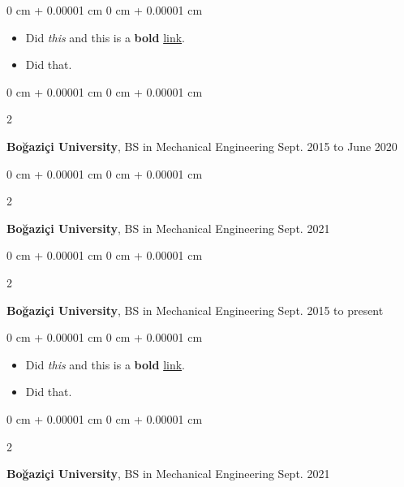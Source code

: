 \documentclass[10pt, letterpaper]{article}
\newenvironment{highlights}{
    \begin{itemize}[
        topsep=0.10 cm,
        parsep=0.10 cm,
        partopsep=0pt,
        itemsep=0pt,
        leftmargin=0 cm + 10pt
    ]
}{
    \end{itemize}
} %
\newenvironment{onecolentry}{
    \begin{adjustwidth}{
        0 cm + 0.00001 cm
    }{
        0 cm + 0.00001 cm
    }
}{
    \end{adjustwidth}
} %
\newenvironment{twocolentry}[2][]{
    \onecolentry
    \def\secondColumn{#2}
    \setcolumnwidth{\fill, 4.5 cm}
    \begin{paracol}{2}
}{
    \switchcolumn \raggedleft \secondColumn
    \end{paracol}
    \endonecolentry
} %
\begin{document}
        \vspace{0.10 cm}
        \begin{onecolentry}
            \begin{highlights}
                \item Did \textit{this} and this is a \textbf{bold} \href{https://example.com}{link}.
                \item Did that.
            \end{highlights}
        \end{onecolentry}


        \vspace{0.2 cm}

        \begin{twocolentry}{
            Sept. 2015 to June 2020
        }
            \textbf{Boğaziçi University}, BS in Mechanical Engineering\end{twocolentry}



        \vspace{0.2 cm}

        \begin{twocolentry}{
            Sept. 2021
        }
            \textbf{Boğaziçi University}, BS in Mechanical Engineering\end{twocolentry}



        \vspace{0.2 cm}

        \begin{twocolentry}{
            Sept. 2015 to present
        }
            \textbf{Boğaziçi University}, BS in Mechanical Engineering\end{twocolentry}

        \vspace{0.10 cm}
        \begin{onecolentry}
            \begin{highlights}
                \item Did \textit{this} and this is a \textbf{bold} \href{https://example.com}{link}.
                \item Did that.
            \end{highlights}
        \end{onecolentry}


        \vspace{0.2 cm}

        \begin{twocolentry}{
            Sept. 2021
        }
            \textbf{Boğaziçi University}, BS in Mechanical Engineering\end{twocolentry}
\end{document}
